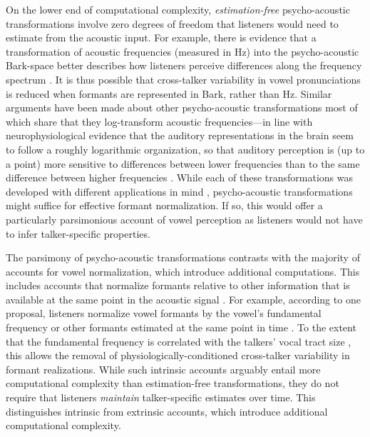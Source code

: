 \documentclass[preprint]{JASA}
\begin{document}
On the lower end of computational complexity, \emph{estimation-free} psycho-acoustic transformations involve zero degrees of freedom that listeners would need to estimate from the acoustic input. For example, there is evidence that a transformation of acoustic frequencies (measured in Hz) into the psycho-acoustic Bark-space better describes how listeners perceive differences along the frequency spectrum \citep[in terms of critical bands, e.g.,][]{traunmuller1990, zwicker1957, zwicker1961, zwicker-terhardt1980}. It is thus possible that cross-talker variability in vowel pronunciations is reduced when formants are represented in Bark, rather than Hz. Similar arguments have been made about other psycho-acoustic transformations \citetext{\citealp[e.g., ERB,][]{glasberg-moore1990}; \citealp[Mel,][]{stevens-volkmann1940}; \citealp[or semitones,][]{fant2002}} most of which share that they log-transform acoustic frequencies---in line with neurophysiological evidence that the auditory representations in the brain seem to follow a roughly logarithmic organization, so that auditory perception is (up to a point) more sensitive to differences between lower frequencies than to the same difference between higher frequencies \citetext{\citealp[e.g.,][]{merzenich1975}; \citealp[for review, see][]{saenz-langers2014}}. While each of these transformations was developed with different applications in mind \citetext{\citealp[e.g., ERB and Bark to explain frequency selectivity,][]{glasberg-moore1990}; \citealp[or semitones for the perception of musical pitch,][]{balzano1982}}, psycho-acoustic transformations might suffice for effective formant normalization. If so, this would offer a particularly parsimonious account of vowel perception as listeners would not have to infer talker-specific properties.

The parsimony of psycho-acoustic transformations contrasts with the majority of accounts for vowel normalization, which introduce additional computations. This includes accounts that normalize formants relative to other information that is available at the same point in the acoustic signal \citep[intrinsic normalization, e.g.,][]{miller1989, peterson1961, syrdal-gopal1986}. For example, according to one proposal, listeners normalize vowel formants by the vowel's fundamental frequency or other formants estimated at the same point in time \citep{syrdal-gopal1986}. To the extent that the fundamental frequency is correlated with the talkers' vocal tract size \citep[for review, see][]{vorperian-kent2007}, this allows the removal of physiologically-conditioned cross-talker variability in formant realizations. While such intrinsic accounts arguably entail more computational complexity than estimation-free transformations, they do not require that listeners \emph{maintain} talker-specific estimates over time. This distinguishes intrinsic from extrinsic accounts, which introduce additional computational complexity.
\end{document}
